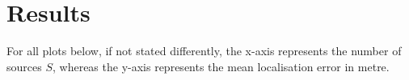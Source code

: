\newlength\figureheight
\newlength\figurewidth
\setlength\figureheight{8cm}
\setlength\figurewidth{8cm}

\chapter{Results}
\label{chap:results}

For all plots below, if not stated differently, the x-axis represents the number of sources $S$, whereas the y-axis represents the mean localisation error in metre.